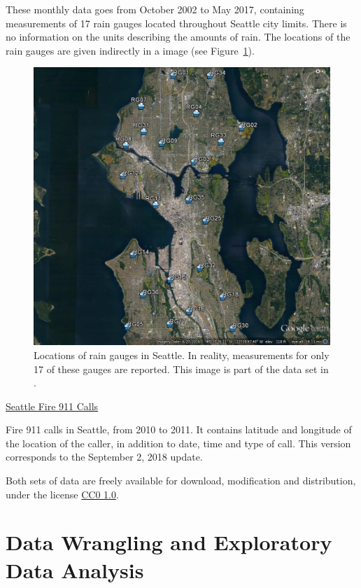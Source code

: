 \documentclass[12pt,a4paper]{article}
\begin{document}
These monthly data goes from October 2002 to May 2017, containing measurements of 17 rain gauges located throughout Seattle city limits. There is no information on the units describing the amounts of rain. The locations of the rain gauges are given indirectly in a image (see Figure~\ref{gauges}).

\begin{figure}[ht!]
\centering
\includegraphics[scale=0.3]{figs/SPU_DWW_RGs.jpg}
\caption{Locations of rain gauges in Seattle. In reality, measurements for only 17 of these gauges are reported. This image is part of the data set in \cite{Daniels2018}.}
\label{gauges}
\end{figure}



{\large \href{https://data.seattle.gov/Public-Safety/Seattle-Fire-911-Calls-from-3-1-2010-to-3-1-2011/d9j6-s59d}{Seattle Fire 911 Calls} \cite{FireData2018}}

Fire 911 calls in Seattle, from 2010 to 2011. It contains latitude and longitude of the location of the caller, in addition to date, time and type of call. This version corresponds to the September 2, 2018 update.

Both sets of data are freely available for download, modification and distribution, under the license \href{https://creativecommons.org/publicdomain/zero/1.0/legalcode}{CC0 1.0}.

\section{Data Wrangling and Exploratory Data Analysis}
\end{document}
